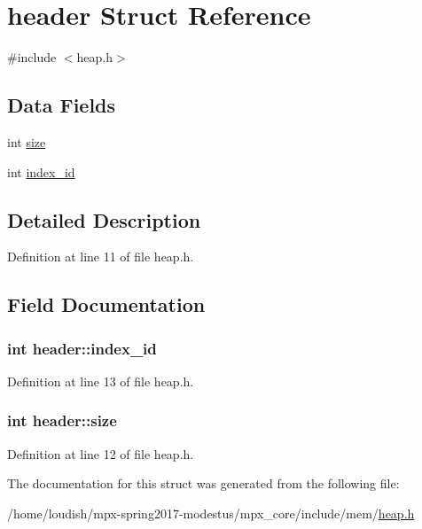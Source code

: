 \hypertarget{structheader}{}\section{header Struct Reference}
\label{structheader}


{\ttfamily \#include $<$heap.\+h$>$}

\subsection*{Data Fields}
\begin{DoxyCompactItemize}
\item 
int \hyperlink{structheader_af8cc659f702446226bc2ebabba437d5d}{size}
\item 
int \hyperlink{structheader_aec42bcd6139d12f84d54b5e6a149b276}{index\+\_\+id}
\end{DoxyCompactItemize}


\subsection{Detailed Description}


Definition at line 11 of file heap.\+h.



\subsection{Field Documentation}
\subsubsection[{\texorpdfstring{index\+\_\+id}{index_id}}]{\setlength{\rightskip}{0pt plus 5cm}int header\+::index\+\_\+id}\hypertarget{structheader_aec42bcd6139d12f84d54b5e6a149b276}{}\label{structheader_aec42bcd6139d12f84d54b5e6a149b276}


Definition at line 13 of file heap.\+h.

\subsubsection[{\texorpdfstring{size}{size}}]{\setlength{\rightskip}{0pt plus 5cm}int header\+::size}\hypertarget{structheader_af8cc659f702446226bc2ebabba437d5d}{}\label{structheader_af8cc659f702446226bc2ebabba437d5d}


Definition at line 12 of file heap.\+h.



The documentation for this struct was generated from the following file\+:\begin{DoxyCompactItemize}
\item 
/home/loudish/mpx-\/spring2017-\/modestus/mpx\+\_\+core/include/mem/\hyperlink{heap_8h}{heap.\+h}\end{DoxyCompactItemize}
